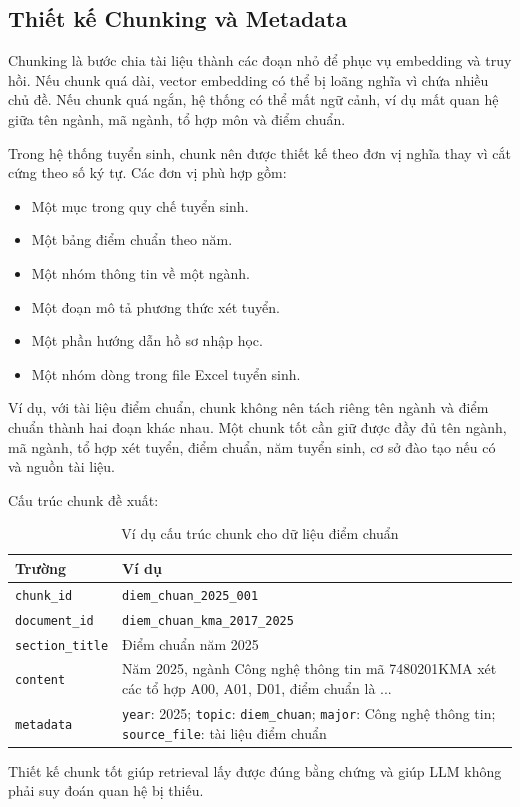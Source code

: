 \subsection{Thiết kế Chunking và Metadata}

Chunking là bước chia tài liệu thành các đoạn nhỏ để phục vụ embedding và truy hồi. Nếu chunk quá dài, vector embedding có thể bị loãng nghĩa vì chứa nhiều chủ đề. Nếu chunk quá ngắn, hệ thống có thể mất ngữ cảnh, ví dụ mất quan hệ giữa tên ngành, mã ngành, tổ hợp môn và điểm chuẩn.

Trong hệ thống tuyển sinh, chunk nên được thiết kế theo đơn vị nghĩa thay vì cắt cứng theo số ký tự. Các đơn vị phù hợp gồm:

\begin{itemize}
    \item Một mục trong quy chế tuyển sinh.
    \item Một bảng điểm chuẩn theo năm.
    \item Một nhóm thông tin về một ngành.
    \item Một đoạn mô tả phương thức xét tuyển.
    \item Một phần hướng dẫn hồ sơ nhập học.
    \item Một nhóm dòng trong file Excel tuyển sinh.
\end{itemize}

Ví dụ, với tài liệu điểm chuẩn, chunk không nên tách riêng tên ngành và điểm chuẩn thành hai đoạn khác nhau. Một chunk tốt cần giữ được đầy đủ tên ngành, mã ngành, tổ hợp xét tuyển, điểm chuẩn, năm tuyển sinh, cơ sở đào tạo nếu có và nguồn tài liệu.

Cấu trúc chunk đề xuất:

\begin{table}[H]
\centering
\begin{tabular}{|p{3.8cm}|p{9cm}|}
\hline
\textbf{Trường} & \textbf{Ví dụ} \\
\hline
\texttt{chunk\_id} & \texttt{diem\_chuan\_2025\_001} \\
\hline
\texttt{document\_id} & \texttt{diem\_chuan\_kma\_2017\_2025} \\
\hline
\texttt{section\_title} & Điểm chuẩn năm 2025 \\
\hline
\texttt{content} & Năm 2025, ngành Công nghệ thông tin mã 7480201KMA xét các tổ hợp A00, A01, D01, điểm chuẩn là ... \\
\hline
\texttt{metadata} & \texttt{year}: 2025; \texttt{topic}: \texttt{diem\_chuan}; \texttt{major}: Công nghệ thông tin; \texttt{source\_file}: tài liệu điểm chuẩn \\
\hline
\end{tabular}
\caption{Ví dụ cấu trúc chunk cho dữ liệu điểm chuẩn}
\label{tab:rag-chunk-structure}
\end{table}

Thiết kế chunk tốt giúp retrieval lấy được đúng bằng chứng và giúp LLM không phải suy đoán quan hệ bị thiếu.
